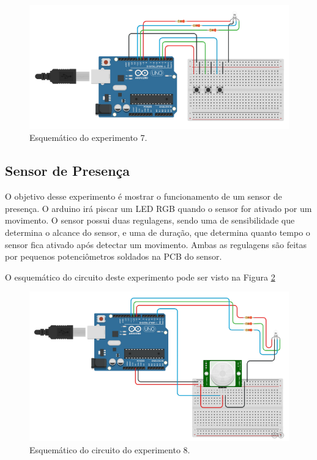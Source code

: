\documentclass[12pt]{article}
\begin{document}
\begin{figure}[H]
	\centering
	\includegraphics[scale=0.6]{Imagens/Experimentos/7-LED-RGB/esq.png}
	\caption{Esquemático do experimento 7.}
	\label{figExp7esq}
\end{figure}

\subsection{Sensor de Presença}
O objetivo desse experimento é mostrar o funcionamento de um sensor de presença. O arduino irá piscar um LED RGB quando o sensor for ativado por um movimento. O sensor possui duas regulagens, sendo uma de sensibilidade que determina o alcance do sensor, e uma de duração, que determina quanto tempo o sensor fica ativado após detectar um movimento. Ambas as regulagens são feitas por pequenos potenciômetros soldados na PCB do sensor.

O esquemático do circuito deste experimento pode ser visto na Figura \ref{figExp8esq}

\begin{figure}[H]
	\centering
	\includegraphics[scale=0.5]{Imagens/Experimentos/8-SensorPresenca/esq.png}
	\caption{Esquemático do circuito do experimento 8.}
	\label{figExp8esq}
\end{figure}
\end{document}
